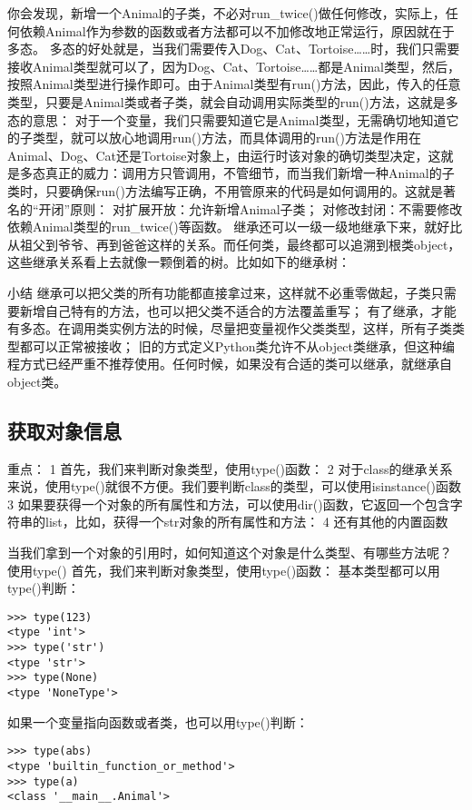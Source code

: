 \documentclass[twoside,11pt]{book}
\begin{document}
你会发现，新增一个Animal的子类，不必对run\_twice()做任何修改，实际上，任何依赖Animal作为参数的函数或者方法都可以不加修改地正常运行，原因就在于多态。
多态的好处就是，当我们需要传入Dog、Cat、Tortoise……时，我们只需要接收Animal类型就可以了，因为Dog、Cat、Tortoise……都是Animal类型，然后，按照Animal类型进行操作即可。由于Animal类型有run()方法，因此，传入的任意类型，只要是Animal类或者子类，就会自动调用实际类型的run()方法，这就是多态的意思：
对于一个变量，我们只需要知道它是Animal类型，无需确切地知道它的子类型，就可以放心地调用run()方法，而具体调用的run()方法是作用在Animal、Dog、Cat还是Tortoise对象上，由运行时该对象的确切类型决定，这就是多态真正的威力：调用方只管调用，不管细节，而当我们新增一种Animal的子类时，只要确保run()方法编写正确，不用管原来的代码是如何调用的。这就是著名的“开闭”原则：
对扩展开放：允许新增Animal子类；
对修改封闭：不需要修改依赖Animal类型的run\_twice()等函数。
继承还可以一级一级地继承下来，就好比从祖父到爷爷、再到爸爸这样的关系。而任何类，最终都可以追溯到根类object，这些继承关系看上去就像一颗倒着的树。比如如下的继承树：

小结
继承可以把父类的所有功能都直接拿过来，这样就不必重零做起，子类只需要新增自己特有的方法，也可以把父类不适合的方法覆盖重写；
有了继承，才能有多态。在调用类实例方法的时候，尽量把变量视作父类类型，这样，所有子类类型都可以正常被接收；
旧的方式定义Python类允许不从object类继承，但这种编程方式已经严重不推荐使用。任何时候，如果没有合适的类可以继承，就继承自object类。

\subsection{获取对象信息}
重点：
1 首先，我们来判断对象类型，使用type()函数：
2 对于class的继承关系来说，使用type()就很不方便。我们要判断class的类型，可以使用isinstance()函数
3 如果要获得一个对象的所有属性和方法，可以使用dir()函数，它返回一个包含字符串的list，比如，获得一个str对象的所有属性和方法：
4 还有其他的内置函数


当我们拿到一个对象的引用时，如何知道这个对象是什么类型、有哪些方法呢？
使用type()
首先，我们来判断对象类型，使用type()函数：
基本类型都可以用type()判断：
\begin{lstlisting}
>>> type(123)
<type 'int'>
>>> type('str')
<type 'str'>
>>> type(None)
<type 'NoneType'>
\end{lstlisting}

如果一个变量指向函数或者类，也可以用type()判断：
\begin{lstlisting}
>>> type(abs)
<type 'builtin_function_or_method'>
>>> type(a)
<class '__main__.Animal'>
\end{lstlisting}
\end{document}
